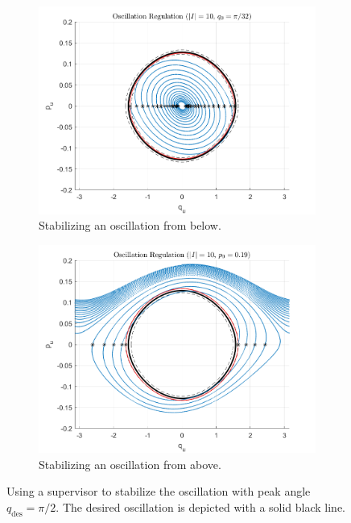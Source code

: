 \documentclass[journal,twoside,web]{ieeecolor}
\begin{document}
{\begin{figure}
    \centering
    \begin{subfigure}[t]{0.49\linewidth}
        \includegraphics[width=\linewidth]{acrobot_osc_orbit_1.png}
        \caption{Stabilizing an oscillation from below.}
        \label{fig:acrobot-osc-reg-in}
    \end{subfigure}
    \begin{subfigure}[t]{0.49\linewidth}
        \includegraphics[width=\linewidth]{acrobot_osc_orbit_2.png}
        \caption{Stabilizing an oscillation from above.}
        \label{fig:acrobot-osc-reg-diss}
    \end{subfigure}
    \caption{Using a supervisor to stabilize the oscillation with peak angle
    \(q_\text{des} = \pi/2\). The desired oscillation is depicted with a solid
    black line.}
    \label{fig:acrobot-osc-reg}
\end{figure}

}
\end{document}
